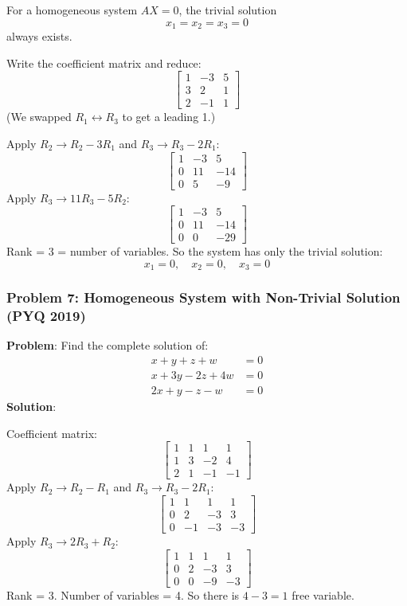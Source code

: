 \documentclass[
]{article}
\begin{document}
For a homogeneous system \(AX = 0\), the trivial solution
\[
x_1 = x_2 = x_3 = 0
\]
always exists.

Write the coefficient matrix and reduce:
\[
\begin{bmatrix}
1 & -3 & 5 \\
3 & 2 & 1 \\
2 & -1 & 1
\end{bmatrix}
\]
(We swapped \(R_1 \leftrightarrow R_3\) to get a leading 1.)

Apply \(R_2 \to R_2 - 3R_1\) and \(R_3 \to R_3 - 2R_1\):
\[
\begin{bmatrix}
1 & -3 & 5 \\
0 & 11 & -14 \\
0 & 5 & -9
\end{bmatrix}
\]
Apply \(R_3 \to 11R_3 - 5R_2\):
\[
\begin{bmatrix}
1 & -3 & 5 \\
0 & 11 & -14 \\
0 & 0 & -29
\end{bmatrix}
\]
Rank = 3 = number of variables. So the system has only the trivial
solution:
\[
x_1 = 0, \quad x_2 = 0, \quad x_3 = 0
\]

\subsubsection{Problem 7: Homogeneous System with Non-Trivial Solution
(PYQ
2019)}\label{problem-7-homogeneous-system-with-non-trivial-solution-pyq-2019}

\textbf{Problem}: Find the complete solution of:
\[
\begin{aligned}
x + y + z + w &= 0 \\
x + 3y - 2z + 4w &= 0 \\
2x + y - z - w &= 0
\end{aligned}
\]
\textbf{Solution}:

Coefficient matrix:
\[
\begin{bmatrix}
1 & 1 & 1 & 1 \\
1 & 3 & -2 & 4 \\
2 & 1 & -1 & -1
\end{bmatrix}
\]
Apply \(R_2 \to R_2 - R_1\) and \(R_3 \to R_3 - 2R_1\):
\[
\begin{bmatrix}
1 & 1 & 1 & 1 \\
0 & 2 & -3 & 3 \\
0 & -1 & -3 & -3
\end{bmatrix}
\]
Apply \(R_3 \to 2R_3 + R_2\):
\[
\begin{bmatrix}
1 & 1 & 1 & 1 \\
0 & 2 & -3 & 3 \\
0 & 0 & -9 & -3
\end{bmatrix}
\]
Rank = 3. Number of variables = 4. So there is \(4 - 3 = 1\) free
variable.
\end{document}
